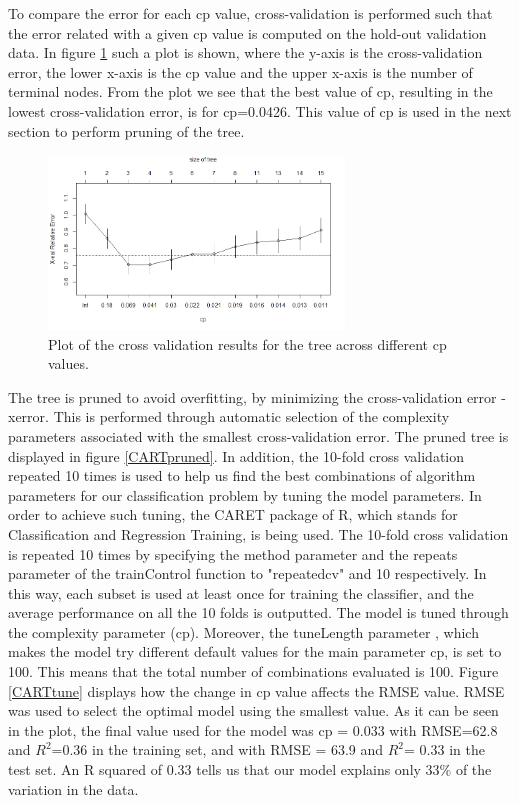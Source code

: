 \documentclass{usiinftr}
\begin{document}
To compare the error for each cp value, cross-validation is performed such that the error related with a given cp value is computed on the hold-out validation data. In figure \ref{CARTcv} such a plot is shown, where the y-axis is the cross-validation error, the lower x-axis is the cp value and the upper x-axis is the number of terminal nodes. From the plot we see that the best value of cp, resulting in the lowest cross-validation error, is for cp=0.0426. This value of cp is used in the next section to perform pruning of the tree. 

\begin{figure}[h!] 
\centering
\includegraphics[width=0.7\textwidth]{images/image111.png}
\caption{Plot of the cross validation results for the tree across different cp values.}
\label{CARTcv}
\end{figure}

The tree is pruned to avoid overfitting, by minimizing the cross-validation error - xerror. This is performed through automatic selection of the complexity parameters associated with the smallest cross-validation error. The pruned tree is displayed in figure \ref{CARTpruned}. In addition, the 10-fold cross validation repeated 10 times is used to help us find the best combinations of algorithm parameters for our classification problem by tuning the model parameters. In order to achieve such tuning, the CARET package of R, which stands for Classification and Regression Training, is being used. The 10-fold cross validation is repeated 10 times by specifying the method parameter and the repeats parameter of the trainControl function to "repeatedcv" and 10 respectively. In this way, each subset is used at least once for training the classifier, and the average performance on all the 10 folds is outputted. The model is tuned through the complexity parameter (cp). Moreover, the tuneLength parameter , which makes the model try different default values for the main parameter cp, is set to 100. This means that the total number of combinations evaluated is 100. Figure \ref{CARTtune} displays how the change in cp value affects the RMSE value. RMSE was used to select the optimal model using the smallest value. As it can be seen in the plot, the final value used for the model was cp = 0.033 with RMSE=62.8 and $R^2$=0.36 in the training set, and with RMSE = 63.9 and $R^2$= 0.33 in the test set. An R squared of 0.33 tells us that our model explains only 33\% of the variation in the data.
\end{document}
